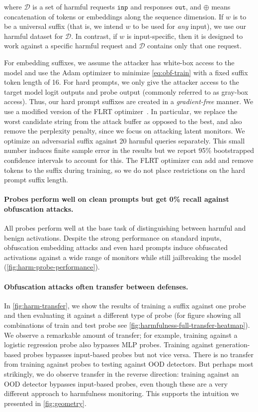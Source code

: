 \documentclass{article}
\let\tc\texttt
\begin{document}
where $\mathcal{D}$ is a set of harmful requests $\tc{inp}$ and responses 
$\tc{out}$, and $\oplus$ means
concatenation of tokens or embeddings along the sequence dimension.
If $w$ is to be a universal suffix (that is, 
we intend $w$ to be used for \emph{any} 
input),
we use our harmful dataset for $\mathcal{D}$. 
In contrast, if
$w$ is input-specific, then it is designed to work
against a specific harmful request and $\mathcal{D}$ contains only that one request.

For embedding suffixes, we assume the attacker 
has white-box access to the model and use the Adam optimizer to minimize \cref{eq:obf-train} with a fixed suffix token length of 16.
For hard prompts, we only give the attacker access to the target 
model logit outputs and probe output (commonly
referred to as gray-box access). Thus, our 
hard prompt suffixes are created in a 
\emph{gradient-free} manner. We 
use a modified version of the FLRT optimizer~\citep{thompson2024flrt}. In particular, we replace the worst candidate string from the attack buffer as opposed to the best, and also remove the perplexity penalty, since we focus on attacking latent monitors. We optimize an adversarial suffix 
against 20 harmful queries separately. This small number induces 
finite sample error in the results but we report 95\% bootstrapped confidence 
intervals to account for this. The FLRT optimizer can add and remove 
tokens to the suffix during training, so we do not place restrictions 
on the hard prompt suffix length.




\paragraph{Probes perform well on 
clean prompts but get 0\% recall 
against obfuscation attacks.} All probes perform 
well at the base task of distinguishing 
between harmful and benign activations.
Despite the strong performance on 
standard inputs, obfuscation embedding attacks and even hard prompts
induce obfuscated activations 
against a wide range of 
monitors while still jailbreaking the model (\cref{fig:harm-probe-performance}).

\paragraph{Obfuscation attacks often transfer between defenses.}
In \cref{fig:harm-transfer}, we show the results of training a 
suffix against one probe and then evaluating it against a different type of 
probe (for figure showing all combinations of train and test 
probe see \cref{fig:harmfulness-full-transfer-heatmap}).
We observe a remarkable amount of transfer; for example, training against a logistic regression probe also bypasses MLP probes. Training against generation-based probes bypasses input-based probes but not vice versa. There is no transfer from training against probes to testing against OOD detectors.
But perhaps most strikingly, we do observe transfer in the reverse direction: training against an OOD detector bypasses input-based probes, even though these are a very different approach to harmfulness monitoring. This supports the intuition we presented in \cref{fig:geometry}.
\end{document}
